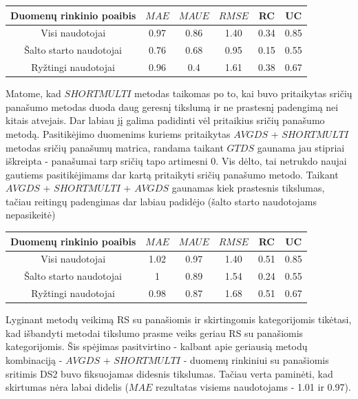 \documentclass{VUMIFInfMagistrinis}
\begin{document}
\begin{center}
	\begin{tabular}{||c c c c c c||} 
		Duomenų rinkinio poaibis & $MAE$ & $MAUE$ & $RMSE$ & RC & UC \\
		\hline
		Visi naudotojai & 0.97 & 0.86 & 1.40 & 0.34 & 0.85 \\
		\hline
		Šalto starto naudotojai & 0.76 & 0.68 & 0.95 & 0.15 & 0.55 \\
		\hline
		Ryžtingi naudotojai & 0.96 & 0.4 & 1.61 & 0.38 & 0.67 \\
	\end{tabular}
\end{center}
\indent 
Matome, kad $SHORTMULTI$ metodas taikomas po to, kai buvo pritaikytas sričių panašumo metodas duoda daug geresnį tikslumą ir ne prastesnį padengimą nei kitais atvejais. Dar labiau jį galima padidinti vėl pritaikius sričių panašumo metodą. 
\newline
\indent
Pasitikėjimo duomenims kuriems pritaikytas $AVGDS$ + $SHORTMULTI$ metodas sričių panašumų matrica, randama taikant $GTDS$ gaunama jau stipriai iškreipta - panašumai tarp sričių tapo artimesni 0. Vis dėlto, tai netrukdo naujai gautiems pasitikėjimams dar kartą pritaikyti sričių panašumo metodo. Taikant $AVGDS$ + $SHORTMULTI$ + $AVGDS$ gaunamas kiek prastesnis tikslumas, tačiau reitingų padengimas dar labiau padidėjo (šalto starto naudotojams nepasikeitė)
\begin{center}
	\begin{tabular}{||c c c c c c||} 
		Duomenų rinkinio poaibis & $MAE$ & $MAUE$ & $RMSE$ & RC & UC \\
		\hline
		Visi naudotojai & 1.02 & 0.97 & 1.40 & 0.51 & 0.85 \\
		\hline
		Šalto starto naudotojai & 1 & 0.89 & 1.54 & 0.24 & 0.55 \\
		\hline
		Ryžtingi naudotojai & 0.98 & 0.87 & 1.68 & 0.51 & 0.67 \\
	\end{tabular}
\end{center}
\indent
Lyginant metodų veikimą RS su panašiomis ir skirtingomis kategorijomis tikėtasi, kad išbandyti metodai tikslumo prasme veiks geriau RS su panašiomis kategorijomis. Šis spėjimas pasitvirtino - kalbant apie geriausią metodų kombinaciją - $AVGDS$ + $SHORTMULTI$ - duomenų rinkiniui su panašiomis sritimis DS2 buvo fiksuojamas didesnis tikslumas. Tačiau verta paminėti, kad skirtumas nėra labai didelis ($MAE$ rezultatas visiems naudotojams - 1.01 ir 0.97).
\end{document}

